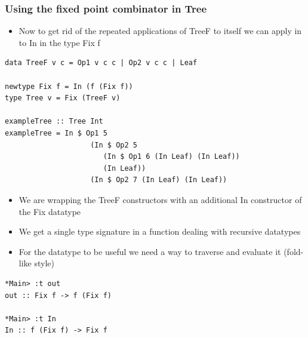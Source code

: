 \documentclass[10pt]{beamer}
\begin{document}
\begin{frame}[fragile]
\frametitle{Using the fixed point combinator in Tree}
\begin{itemize}
\item Now to get rid of the repeated applications of TreeF to itself we can apply in to In in the type Fix f
\end{itemize}

\begin{lstlisting}
data TreeF v c = Op1 v c c | Op2 v c c | Leaf

newtype Fix f = In (f (Fix f))
type Tree v = Fix (TreeF v)

exampleTree :: Tree Int
exampleTree = In $ Op1 5 
                    (In $ Op2 5 
                       (In $ Op1 6 (In Leaf) (In Leaf))
                       (In Leaf)) 
                    (In $ Op2 7 (In Leaf) (In Leaf))
\end{lstlisting}


\begin{itemize}
\item We are wrapping the TreeF constructors with an additional In constructor of the Fix datatype
\item We get a single type signature in a function dealing with recursive datatypes
\item For the datatype to be useful we need a way to traverse and evaluate it (fold-like style) 

\end{itemize}

\begin{lstlisting}
*Main> :t out 
out :: Fix f -> f (Fix f)

*Main> :t In
In :: f (Fix f) -> Fix f
\end{lstlisting}


\end{frame}
\end{document}
